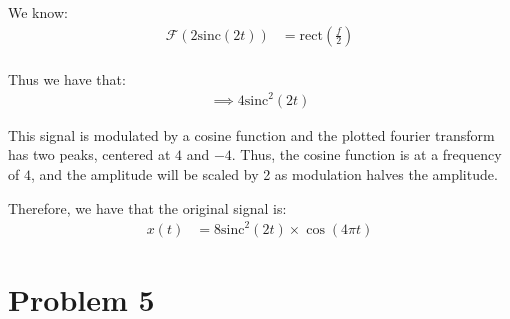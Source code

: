 \documentclass{article}
\begin{document}
We know:
\begin{align*}
    \mathcal{F}(2\text{sinc}(2t)) &= \text{rect}\left(\frac{f}{2}\right) \\
\end{align*}

Thus we have that:
\begin{align*}
    \implies 4\text{sinc}^2(2t)
\end{align*}

This signal is modulated by a cosine function and the plotted fourier transform has two peaks, centered at $4$ and $-4$. Thus, the cosine function is at a frequency of $4$, and the amplitude will be scaled by 2 as modulation halves the amplitude.

Therefore, we have that the original signal is:
\begin{align*}
    x(t) &= 8\text{sinc}^2(2t) \times \cos(4\pi t)
\end{align*}

\section{Problem 5}
\end{document}
